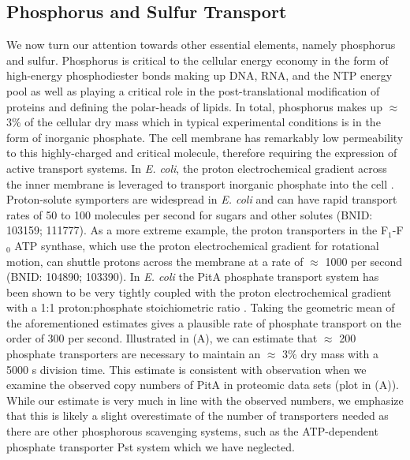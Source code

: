\subsection{Phosphorus and Sulfur Transport}
We now turn our attention towards other essential elements, namely phosphorus and
sulfur. Phosphorus is critical to the cellular energy economy in the form of
high-energy phosphodiester bonds making up DNA, RNA, and the NTP energy pool as
well as playing a critical role in the post-translational modification of
proteins and defining the polar-heads of lipids. In total, phosphorus
makes up $\approx$3\% of the cellular dry mass which in typical experimental conditions is in the form of inorganic phosphate. The cell membrane
has remarkably low permeability to this highly-charged and critical molecule,
therefore requiring the expression of active transport systems. In \textit{E. coli}, the proton
electrochemical gradient across the inner membrane is leveraged to transport
inorganic phosphate into the cell \citep{rosenberg1977}.
Proton-solute symporters are widespread in \textit{E. coli} \citep{ramos1977,
booth1979} and can have rapid transport rates of 50 to 100 molecules per second for
sugars and other solutes (BNID: 103159; 111777). As a more
extreme example, the proton transporters in the F$_1$-F$_0$ ATP synthase, which
use the proton electrochemical gradient for rotational motion, can shuttle
protons across the membrane at a rate of $\approx$ 1000 per second (BNID:
104890; 103390). In \textit{E.
coli} the PitA phosphate transport system has been shown to be very tightly coupled
with the proton electrochemical gradient with a 1:1 proton:phosphate
stoichiometric ratio \citep{harris2001, feist2007}. Taking the geometric mean of
the aforementioned estimates gives a plausible rate of phosphate transport on
the order of 300  per second. Illustrated in
(A), we can estimate that $\approx$ 200
phosphate transporters are necessary to maintain an $\approx$ 3\% dry mass with
a 5000 s division time. This estimate is consistent with observation when we examine the
observed copy numbers of PitA in proteomic data sets (plot in
(A)). While our estimate is very much in line with the
observed numbers, we emphasize that this is likely a slight overestimate of the
number of transporters needed as there are other phosphorous scavenging systems,
such as the ATP-dependent phosphate transporter Pst system which we have neglected.


